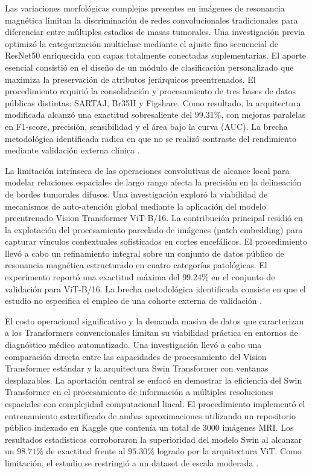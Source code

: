 Las variaciones morfológicas complejas presentes en imágenes de resonancia magnética limitan la discriminación de redes convolucionales tradicionales para diferenciar entre múltiples estadios de masas tumorales. Una investigación previa optimizó la categorización multiclase mediante el ajuste fino secuencial de ResNet50 enriquecida con capas totalmente conectadas suplementarias. El aporte esencial consistió en el diseño de un módulo de clasificación personalizado que maximiza la preservación de atributos jerárquicos preentrenados. El procedimiento requirió la consolidación y procesamiento de tres bases de datos públicas distintas: SARTAJ, Br35H y Figshare. Como resultado, la arquitectura modificada alcanzó una exactitud sobresaliente del $99.31\%$, con mejoras paralelas en F1-score, precisión, sensibilidad y el área bajo la curva (AUC). La brecha metodológica identificada radica en que no se realizó contraste del rendimiento mediante validación externa clínica \cite{Mitra2025}.

La limitación intrínseca de las operaciones convolutivas de alcance local para modelar relaciones espaciales de largo rango afecta la precisión en la delineación de bordes tumorales difusos. Una investigación exploró la viabilidad de mecanismos de auto-atención global mediante la aplicación del modelo preentrenado Vision Transformer ViT-B/16. La contribución principal residió en la explotación del procesamiento parcelado de imágenes (patch embedding) para capturar vínculos contextuales sofisticados en cortes encefálicos. El procedimiento llevó a cabo un refinamiento integral sobre un conjunto de datos público de resonancia magnética estructurado en cuatro categorías patológicas. El experimento reportó una exactitud máxima del $99.24\%$ en el conjunto de validación para ViT-B/16. La brecha metodológica identificada consiste en que el estudio no especifica el empleo de una cohorte externa de validación \cite{Panigrahi2025}.

El costo operacional significativo y la demanda masiva de datos que caracterizan a los Transformers convencionales limitan su viabilidad práctica en entornos de diagnóstico médico automatizado. Una investigación llevó a cabo una comparación directa entre las capacidades de procesamiento del Vision Transformer estándar y la arquitectura Swin Transformer con ventanas desplazables. La aportación central se enfocó en demostrar la eficiencia del Swin Transformer en el procesamiento de información a múltiples resoluciones espaciales con complejidad computacional lineal. El procedimiento implementó el entrenamiento estratificado de ambas aproximaciones utilizando un repositorio público indexado en Kaggle que contenía un total de 3000 imágenes MRI. Los resultados estadísticos corroboraron la superioridad del modelo Swin al alcanzar un $98.71\%$ de exactitud frente al $95.30\%$ logrado por la arquitectura ViT. Como limitación, el estudio se restringió a un dataset de escala moderada \cite{Jain2025}.

